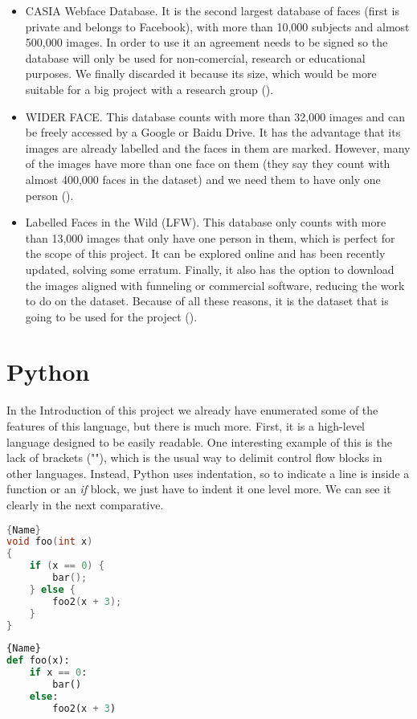 \begin{itemize}
	\item CASIA Webface Database. It is the second largest database of faces (first is private and belongs to Facebook), with more than 10,000 subjects and almost 500,000 images. In order to use it an agreement needs to be signed so the database will only be used for non-comercial, research or educational purposes. We finally discarded it because its size, which would be more suitable for a big project with a research group (\cite{casia_db}). 
	\item WIDER FACE. This database counts with more than 32,000 images and can be freely accessed by a Google or Baidu Drive. It has the advantage that its images are already labelled and the faces in them are marked. However, many of the images have more than one face on them (they say they count with almost 400,000 faces in the dataset) and we need them to have only one person (\cite{widerf_db}).
	\item Labelled Faces in the Wild (LFW). This database only counts with more than 13,000 images that only have one person in them, which is perfect for the scope of this project. It can be explored online and has been recently updated, solving some erratum. Finally, it also has the option to download the images aligned with funneling or commercial software, reducing the work to do on the dataset. Because of all these reasons, it is the dataset that is going to be used for the project (\cite{lfw_db}).
\end{itemize}

\section{Python}
In the Introduction of this project we already have enumerated some of the features of this language, but there is much more. First, it is a high-level language designed to be easily readable. One interesting example of this is the lack of brackets ("{}"), which is the usual way to delimit control flow blocks in other languages. Instead, Python uses indentation, so to indicate a line is inside a function or an \textit{if} block, we just have to indent it one level more. We can see it clearly in the next comparative.

\noindent\begin{minipage}[t]{.45\textwidth}
\begin{lstlisting}[caption=C code,frame=tlrb, language=C]{Name}
void foo(int x)
{
    if (x == 0) {
        bar();
    } else {
        foo2(x + 3);
    }
}
\end{lstlisting}
\end{minipage}\hfill
\begin{minipage}[t]{.45\textwidth}
\begin{lstlisting}[caption=Python code,frame=tlrb, language=Python]{Name}
def foo(x):
    if x == 0:
        bar()
    else:
        foo2(x + 3)
\end{lstlisting}
\end{minipage}

